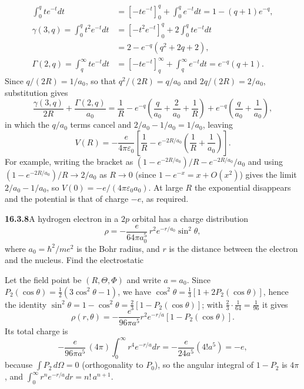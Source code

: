 \[
\begin{aligned}
\int_0^q te^{-t}dt
&=[-te^{-t}]_0^q+\int_0^q e^{-t}dt
=1-(q+1)e^{-q},\\
\gamma(3,q)=\int_0^q t^2e^{-t}dt
&=[-t^2e^{-t}]_0^q+2\int_0^q te^{-t}dt\\
&=2-e^{-q}(q^2+2q+2),\\
\Gamma(2,q)=\int_q^\infty te^{-t}dt
&=[-te^{-t}]_q^\infty+\int_q^\infty e^{-t}dt
=e^{-q}(q+1).
\end{aligned}
\]
Since $q/(2R)=1/a_0$, so that $q^2/(2R)=q/a_0$ and $2q/(2R)=2/a_0$,
substitution gives
\[
\frac{\gamma(3,q)}{2R}+\frac{\Gamma(2,q)}{a_0}
=\frac1R-e^{-q}\left(\frac{q}{a_0}+\frac2{a_0}+\frac1R\right)
+e^{-q}\left(\frac{q}{a_0}+\frac1{a_0}\right),
\]
in which the $q/a_0$ terms cancel and $2/a_0-1/a_0=1/a_0$, leaving
\[
\boxed{V(R)=-\frac{e}{4\pi\varepsilon_0}
\left[\frac1R-e^{-2R/a_0}\left(\frac1R+\frac1{a_0}\right)\right]}.
\]
For example, writing the bracket as
$(1-e^{-2R/a_0})/R-e^{-2R/a_0}/a_0$ and using
$(1-e^{-2R/a_0})/R\to2/a_0$ as $R\to0$ (since $1-e^{-x}=x+O(x^2)$)
gives the limit
$2/a_0-1/a_0$, so $V(0)=-e/(4\pi\varepsilon_0a_0)$. At large $R$ the
exponential disappears and the potential is that of charge $-e$,
as required.

\par\bigskip
\noindent\textbf{16.3.8}\quad A hydrogen electron in a $2p$ orbital
has a charge distribution
\[
\rho=-\frac{e}{64\pi a_{0}^{5}}\,r^{2}e^{-r/a_{0}}\sin^{2}\theta,
\]
where $a_{0}=\hbar^{2}/me^{2}$ is the Bohr radius, and $r$ is the
distance between the electron and the nucleus. Find the electrostatic
\solution
{}

Let the field point be $(R,\Theta,\Phi)$ and write $a=a_0$.
Since $P_2(\cos\theta)=\frac12(3\cos^2\theta-1)$, we have
$\cos^2\theta=\frac13[1+2P_2(\cos\theta)]$, hence the identity
$\sin^2\theta=1-\cos^2\theta=\frac23[1-P_2(\cos\theta)]$; with
$\frac23\cdot\frac1{64}=\frac1{96}$ it gives
\[
\rho(r,\theta)=-\frac{e}{96\pi a^5}r^2e^{-r/a}
[1-P_2(\cos\theta)].
\]
Its total charge is
\[
-\frac{e}{96\pi a^5}\,(4\pi)\int_0^\infty r^4e^{-r/a}dr
=-\frac{e}{24a^5}(4!a^5)=-e,
\]
because $\int P_2\,d\Omega=0$ (orthogonality to $P_0$), so the
angular integral of $1-P_2$ is $4\pi$, and
$\int_0^\infty r^ne^{-r/a}dr=n!\,a^{n+1}$.

